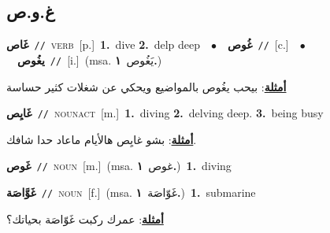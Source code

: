 \documentclass[10pt,a4paper,twoside]{article} %
\begin{document}
\begin{multicols}{2}
\vspace{-3mm}
\subsection*{\color{blue}\foreignlanguage{arabic}{غ.و.ص}\color{blue}{}} 

{\setlength\topsep{0pt}\textbf{\foreignlanguage{arabic}{غَاص}}\ {\color{gray}\texttt{//}\color{black}}\ \textsc{verb}\ [p.]\ \textbf{1.}~dive  \textbf{2.}~delp deep\ \ $\bullet$\ \ \setlength\topsep{0pt}\textbf{\foreignlanguage{arabic}{غُوص}}\ {\color{gray}\texttt{//}\color{black}}\ [c.]\ \ $\bullet$\ \ \setlength\topsep{0pt}\textbf{\foreignlanguage{arabic}{يغُوص}}\ {\color{gray}\texttt{//}\color{black}}\ [i.]\ \color{gray}(msa. \foreignlanguage{arabic}{يَغُوص}~\foreignlanguage{arabic}{\textbf{١.}})\color{black}\  \begin{flushright}\color{gray}\foreignlanguage{arabic}{\textbf{\underline{\foreignlanguage{arabic}{أمثلة}}}: بيحب يغُوص بالمواضيع ويحكي عن شغلات كثير حساسة}\end{flushright}\color{black}} \vspace{2mm}

{\setlength\topsep{0pt}\textbf{\foreignlanguage{arabic}{غَايِص}}\ {\color{gray}\texttt{//}\color{black}}\ \textsc{noun\textunderscore act}\ [m.]\ \textbf{1.}~diving  \textbf{2.}~delving deep.  \textbf{3.}~being busy\  \begin{flushright}\color{gray}\foreignlanguage{arabic}{\textbf{\underline{\foreignlanguage{arabic}{أمثلة}}}: بشو غايِص هالأيام ماعاد حدا شافك.}\end{flushright}\color{black}} \vspace{2mm}

{\setlength\topsep{0pt}\textbf{\foreignlanguage{arabic}{غَوص}}\ {\color{gray}\texttt{//}\color{black}}\ \textsc{noun}\ [m.]\ \color{gray}(msa. \foreignlanguage{arabic}{غوص}~\foreignlanguage{arabic}{\textbf{١.}})\color{black}\ \textbf{1.}~diving\ } \vspace{2mm}

{\setlength\topsep{0pt}\textbf{\foreignlanguage{arabic}{غَوَّاصَة}}\ {\color{gray}\texttt{//}\color{black}}\ \textsc{noun}\ [f.]\ \color{gray}(msa. \foreignlanguage{arabic}{غَوّاصَة}~\foreignlanguage{arabic}{\textbf{١.}})\color{black}\ \textbf{1.}~submarine\  \begin{flushright}\color{gray}\foreignlanguage{arabic}{\textbf{\underline{\foreignlanguage{arabic}{أمثلة}}}: عمرك ركبت غَوّاصَة بحياتك؟}\end{flushright}\color{black}} \vspace{2mm}


\end{multicols}
\end{document}
